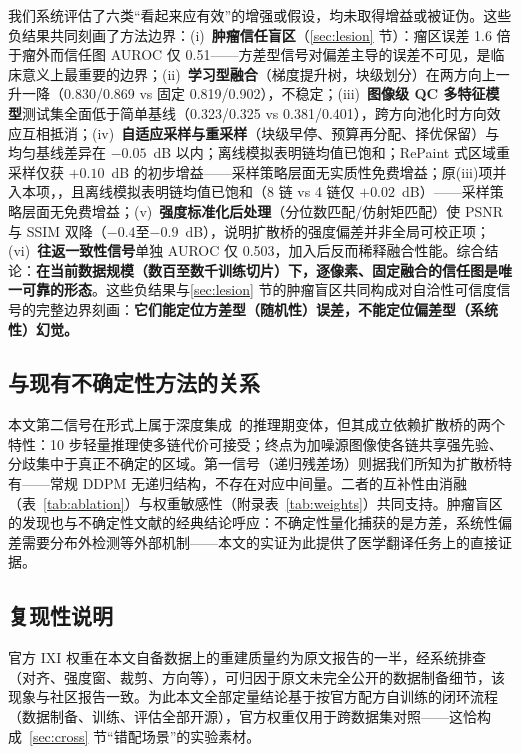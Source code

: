 \documentclass[11pt,a4paper]{ctexart}
\begin{document}
我们系统评估了六类``看起来应有效''的增强或假设，均未取得增益或被证伪。这些负结果共同刻画了方法边界：(i)~\textbf{肿瘤信任盲区}（\ref{sec:lesion} 节）：瘤区误差 1.6 倍于瘤外而信任图 AUROC 仅 0.51——方差型信号对偏差主导的误差不可见，是临床意义上最重要的边界；(ii)~\textbf{学习型融合}（梯度提升树，块级划分）在两方向上一升一降（0.830/0.869 vs 固定 0.819/0.902），不稳定；(iii)~\textbf{图像级 QC 多特征模型}测试集全面低于简单基线（0.323/0.325 vs 0.381/0.401），跨方向池化时方向效应互相抵消；(iv)~\textbf{自适应采样与重采样}（块级早停、预算再分配、择优保留）与均匀基线差异在 $-0.05$~dB 以内；离线模拟表明链均值已饱和；RePaint 式区域重采样仅获 $+0.10$~dB 的初步增益——采样策略层面无实质性免费增益；原(iii)项并入本项，，且离线模拟表明链均值已饱和（8 链 vs 4 链仅 $+0.02$~dB）——采样策略层面无免费增益；(v)~\textbf{强度标准化后处理}（分位数匹配/仿射矩匹配）使 PSNR 与 SSIM 双降（$-0.4$至$-0.9$~dB），说明扩散桥的强度偏差并非全局可校正项；(vi)~\textbf{往返一致性信号}单独 AUROC 仅 0.503，加入后反而稀释融合性能。综合结论：\textbf{在当前数据规模（数百至数千训练切片）下，逐像素、固定融合的信任图是唯一可靠的形态}。这些负结果与\ref{sec:lesion} 节的肿瘤盲区共同构成对自洽性可信度信号的完整边界刻画：\textbf{它们能定位方差型（随机性）误差，不能定位偏差型（系统性）幻觉。}

\subsection{与现有不确定性方法的关系}

本文第二信号在形式上属于深度集成~\cite{lakshminarayanan2017ensembles}的推理期变体，但其成立依赖扩散桥的两个特性：10 步轻量推理使多链代价可接受；终点为加噪源图像使各链共享强先验、分歧集中于真正不确定的区域。第一信号（递归残差场）则据我们所知为扩散桥特有——常规 DDPM 无递归结构，不存在对应中间量。二者的互补性由消融（表~\ref{tab:ablation}）与权重敏感性（附录表~\ref{tab:weights}）共同支持。肿瘤盲区的发现也与不确定性文献的经典结论呼应：不确定性量化捕获的是方差，系统性偏差需要分布外检测等外部机制——本文的实证为此提供了医学翻译任务上的直接证据。

\subsection{复现性说明}
\label{sec:repro}

官方 IXI 权重在本文自备数据上的重建质量约为原文报告的一半，经系统排查（对齐、强度窗、裁剪、方向等），可归因于原文未完全公开的数据制备细节，该现象与社区报告一致。为此本文全部定量结论基于按官方配方自训练的闭环流程（数据制备、训练、评估全部开源），官方权重仅用于跨数据集对照——这恰构成~\ref{sec:cross} 节``错配场景''的实验素材。
\end{document}
